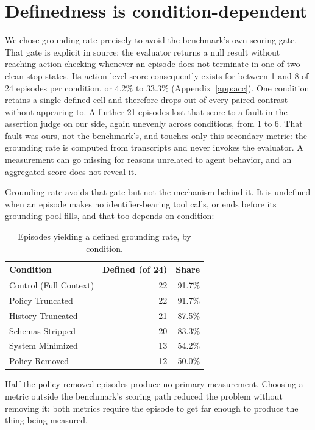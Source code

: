 \documentclass{article}
\begin{document}
\section{Definedness is condition-dependent}

We chose grounding rate precisely to avoid the benchmark's own scoring gate. That gate
is explicit in source: the evaluator returns a null result without reaching action
checking whenever an episode does not terminate in one of two clean stop states. Its
action-level score consequently exists for between 1 and 8 of 24 episodes per
condition, or 4.2\% to 33.3\% (Appendix~\ref{app:acc}). One condition retains a single
defined cell and therefore drops out of every paired contrast without appearing to.
A further 21 episodes lost that score to a fault in the assertion judge on our side,
again unevenly across conditions, from 1 to 6. That fault was ours, not the benchmark's,
and touches only this secondary metric: the grounding rate is computed from transcripts
and never invokes the evaluator. A measurement can go missing for reasons unrelated to
agent behavior, and an aggregated score does not reveal it.

Grounding rate avoids that gate but not the mechanism behind it. It is undefined when
an episode makes no identifier-bearing tool calls, or ends before its grounding pool
fills, and that too depends on condition:

\begin{table}[h]
\centering
\caption{Episodes yielding a defined grounding rate, by condition.}
\begin{tabular}{lrr}
\toprule
Condition & Defined (of 24) & Share \\
\midrule
Control (Full Context) & 22 & 91.7\% \\
Policy Truncated & 22 & 91.7\% \\
History Truncated & 21 & 87.5\% \\
Schemas Stripped & 20 & 83.3\% \\
System Minimized & 13 & 54.2\% \\
Policy Removed & 12 & 50.0\% \\
\bottomrule
\end{tabular}
\end{table}

Half the policy-removed episodes produce no primary measurement. Choosing a metric
outside the benchmark's scoring path reduced the problem without removing it: both
metrics require the episode to get far enough to produce the thing being measured.
\end{document}
